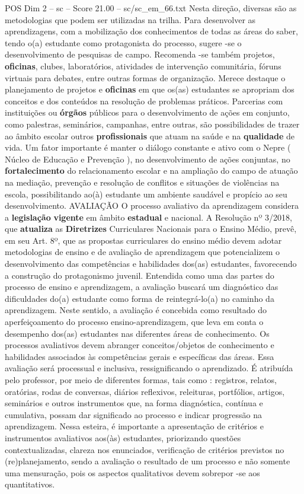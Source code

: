 \begin{textsample}{POS Dim 2 – sc – Score 21.00 – sc/sc\_em\_66.txt}
Nesta direção, diversas são as metodologias que podem ser utilizadas na trilha.
Para desenvolver as aprendizagens, com a mobilização dos conhecimentos de todas as áreas do saber, tendo o(a) estudante como protagonista do processo, sugere -se o desenvolvimento de pesquisas de campo.
Recomenda -se também projetos, \textbf{oficinas}, clubes, laboratórios, atividades de intervenção comunitária, fóruns virtuais para debates, entre outras formas de organização.
Merece destaque o planejamento de projetos e \textbf{oficinas} em que os(as) estudantes se apropriam dos conceitos e dos conteúdos na resolução de problemas práticos.
Parcerias com instituições ou \textbf{órgãos} públicos para o desenvolvimento de ações em conjunto, como palestras, seminários, campanhas, entre outras, são possibilidades de trazer ao âmbito escolar outros \textbf{profissionais} que atuam na saúde e na \textbf{qualidade} de vida.
Um fator importante é manter o diálogo constante e ativo com o Nepre ( Núcleo de Educação e Prevenção ), no desenvolvimento de ações conjuntas, no \textbf{fortalecimento} do relacionamento escolar e na ampliação do campo de atuação na mediação, prevenção e resolução de conflitos e situações de violências na escola, possibilitando ao(à) estudante um ambiente saudável e propício ao seu desenvolvimento.
AVALIAÇÃO O processo avaliativo da aprendizagem considera a \textbf{legislação} \textbf{vigente} em âmbito \textbf{estadual} e nacional.
A Resolução nº 3/2018, que \textbf{atualiza} as \textbf{Diretrizes} Curriculares Nacionais para o Ensino Médio, prevê, em seu Art. 8º, que as propostas curriculares do ensino médio devem adotar metodologias de ensino e de avaliação de aprendizagem que potencializem o desenvolvimento das competências e habilidades dos(as) estudantes, favorecendo a construção do protagonismo juvenil.
Entendida como uma das partes do processo de ensino e aprendizagem, a avaliação buscará um diagnóstico das dificuldades do(a) estudante como forma de reintegrá-lo(a) no caminho da aprendizagem.
Neste sentido, a avaliação é concebida como resultado do aperfeiçoamento do processo ensino-aprendizagem, que leva em conta o desempenho dos(as) estudantes nas diferentes áreas de conhecimento.
Os processos avaliativos devem abranger conceitos/objetos de conhecimento e habilidades associados às competências gerais e específicas das áreas.
Essa avaliação será processual e inclusiva, ressignificando o aprendizado.
É atribuída pelo professor, por meio de diferentes formas, tais como : registros, relatos, oratórias, rodas de conversas, diários reflexivos, releituras, portfólios, artigos, seminários e outros instrumentos que, na forma diagnóstica, contínua e cumulativa, possam dar significado ao processo e indicar progressão na aprendizagem.
Nessa esteira, é importante a apresentação de critérios e instrumentos avaliativos aos(às) estudantes, priorizando questões contextualizadas, clareza nos enunciados, verificação de critérios previstos no (re)planejamento, sendo a avaliação o resultado de um processo e não somente uma mensuração, pois os aspectos qualitativos devem sobrepor -se aos quantitativos.


\end{textsample}
